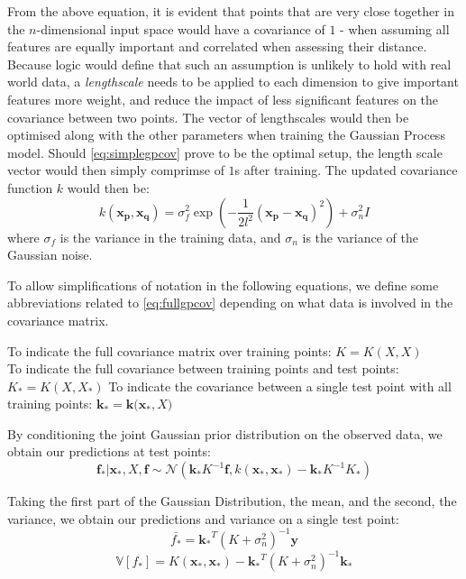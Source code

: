 From the above equation, it is evident that points that are very close together in the $n$-dimensional input space would have a covariance of $1$ - when assuming all features are equally important and correlated when assessing their distance. Because logic would define that such an assumption is unlikely to hold with real world data, a \textit{lengthscale} needs to be applied to each dimension to give important features more weight, and reduce the impact of less significant features on the covariance between two points. The vector of lengthscales would then be optimised along with the other parameters when training the Gaussian Process model. Should \ref{eq:simplegpcov} prove to be the optimal setup, the length scale vector would then simply comprimse of $1$s after training. The updated covariance function $k$ would then be:
\begin{equation}\label{eq:fullgpcov}
    k\mathbf{(x_p, x_q)} = \sigma^2_f \exp(-\frac{1}{2l^2} (\mathbf{x_p-x_q})^2) + \sigma^2_nI
\end{equation}
where $\sigma_f$ is the variance in the training data, and $\sigma_n$ is the variance of the Gaussian noise. 

To allow simplifications of notation in the following equations, we define some abbreviations related to \ref{eq:fullgpcov} depending on what data is involved in the covariance matrix. 

To indicate the full covariance matrix over training points: $K = K(X, X)$ \\
To indicate the full covariance between training points and test points: $K_* = K(X, X_*)$
To indicate the covariance between a single test point with all training points: $\mathbf{k_*} = \mathbf{k(x_*}, X)$

By conditioning the joint Gaussian prior distribution on the observed data, we obtain our predictions at test points:
\begin{equation}
    \mathbf{f_*} | \mathbf{x_*}, X, \mathbf{f} \sim \mathcal{N}( \mathbf{k_*} K^{-1} \mathbf{f},  
    k(\mathbf{x_*, x_*}) - \mathbf{k_*} K^{-1} K_*)
\end{equation}

Taking the first part of the Gaussian Distribution, the mean, and the second, the variance, we obtain our predictions and variance on a single test point:
\begin{equation}
    \bar{f_*} = \mathbf{k_*}^T(K+\sigma_n^2)^{-1} \mathbf{y}
\end{equation}
\begin{equation}
    \mathbb{V}[f_*] = K(\mathbf{x_*},\mathbf{x_*}) - \mathbf{k_*}^T (K+\sigma^2_n)^{-1}\mathbf{k_*}
\end{equation}

